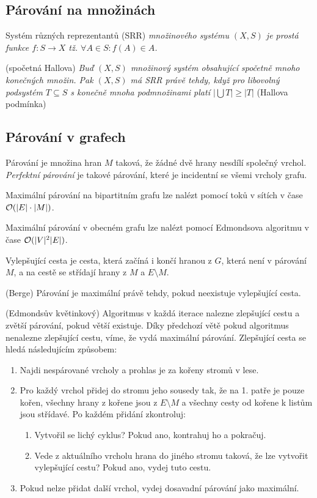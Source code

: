 \subsection{Párování na množinách}

\df Systém různých reprezentantů (SRR) {\it množinového systému $(X,S)$ je
prostá funkce $f:S\rightarrow X$ tž. $\forall A \in S: f(A) \in A$.}

\vt (spočetná Hallova) {\it Buď $(X,S)$ množinový systém obsahující spočetně mnoho konečných množin. Pak $(X,S)$ má SRR právě tehdy, když pro libovolný podsystém $T \subseteq S$ s konečně mnoha podmnožinami platí $|\bigcup T| \ge |T|$} (Hallova podmínka)


\subsection{Párování v grafech}

\df Párování je množina hran $M$ taková, že žádné dvě hrany nesdílí společný
vrchol. {\it Perfektní párování} je takové párování, které je incidentní se
všemi vrcholy grafu.

\tv Maximální párování na bipartitním grafu lze nalézt pomocí toků v sítích v
čase $\mathcal{O}(|E| \cdot |M|)$.

\vt Maximální párování v obecném grafu lze nalézt pomocí Edmondsova algoritmu v
čase $\mathcal{O}(|V|^2|E|)$.

\df Vylepšující cesta je cesta, která začíná i končí hranou z $G$, která není v
párování $M$, a na cestě se střídají hrany z $M$ a $E\setminus M$.

\vt (Berge) Párování je maximální právě tehdy, pokud neexistuje vylepšující
cesta.

\alg (Edmondsův květinkový) Algoritmus v každá iterace nalezne zlepšující cestu
a zvětší párování, pokud větší existuje. Díky předchozí větě pokud algoritmus
nenalezne zlepšující cestu, víme, že vydá maximální párování. Zlepšující cesta
se hledá následujícím způsobem:

\begin{enumerate}
	\item Najdi nespárované vrcholy a prohlas je za kořeny stromů v lese.
	\item Pro každý vrchol přidej do stromu jeho sousedy tak, že na 1. patře je
	pouze kořen, všechny hrany z kořene jsou z $E \setminus M$ a všechny cesty
	od kořene k listům jsou střídavé. Po každém přidání zkontroluj:
	\begin{enumerate}
		\item Vytvořil se lichý cyklus? Pokud ano, kontrahuj ho a pokračuj.
		\item Vede z aktuálního vrcholu hrana do jiného stromu taková, že lze
		vytvořit vylepšující cestu? Pokud ano, vydej tuto cestu.
	\end{enumerate}
	\item Pokud nelze přidat další vrchol, vydej dosavadní párování jako
	maximální.
\end{enumerate}

